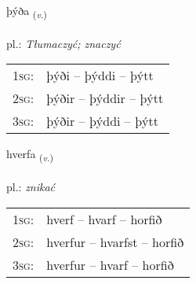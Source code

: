 \documentclass[frontgrid, backgrid]{flacards}\usepackage[]{graphicx}\usepackage[]{xcolor}
\begin{document}
\renewcommand{\flhead}{\vskip5pt \fboxsep=0pt {\small\bfseries\footnotesize Sagnorð | czasownik}}
\renewcommand{\fcfoot}{\vskip5pt \fboxsep=0pt \hspace{2pt}{\small\bfseries\footnotesize 1K}}

\renewcommand{\blhead}{\vskip5pt {\small\bfseries\footnotesize Sagnorð | czasownik }}
\renewcommand{\bcfoot}{\vskip5pt \hspace{2pt}{\small\bfseries\footnotesize 1K}}


{þýða \small{\textsubscript{(\textit{v.})}} \\[1ex] %
\textphonetic{[θiːða]} \\
pl.: \emph{Tłumaczyć; znaczyć} \\  [2ex]
\renewcommand*{\arraystretch}{0.8}
\begin{tabular}{p{1cm}l}
\textsc{1sg}: & þýði -- þýddi -- þýtt \\ 
\textsc{2sg}: & þýðir -- þýddir -- þýtt \\ 
\textsc{3sg}: & þýðir -- þýddi -- þýtt \\ 
\end{tabular}
}

\renewcommand{\flhead}{\vskip5pt \fboxsep=0pt {\small\bfseries\footnotesize Sagnorð | czasownik}}
\renewcommand{\fcfoot}{\vskip5pt \fboxsep=0pt \hspace{2pt}{\small\bfseries\footnotesize 1K}}

\renewcommand{\blhead}{\vskip5pt {\small\bfseries\footnotesize Sagnorð | czasownik }}
\renewcommand{\bcfoot}{\vskip5pt \hspace{2pt}{\small\bfseries\footnotesize 1K}}


{hverfa \small{\textsubscript{(\textit{v.})}} \\[1ex] %
\textphonetic{[kʰvɛrva]} \\
pl.: \emph{znikać} \\  [2ex]
\renewcommand*{\arraystretch}{0.8}
\begin{tabular}{p{1cm}l}
\textsc{1sg}: & hverf -- hvarf -- horfið \\ 
\textsc{2sg}: & hverfur -- hvarfst -- horfið \\ 
\textsc{3sg}: & hverfur -- hvarf -- horfið \\ 
\end{tabular}
}
\end{document}
